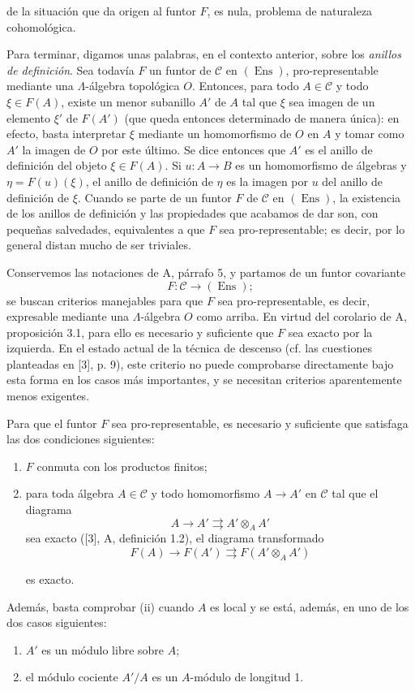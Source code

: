 de la situación que da origen al funtor $F$, es nula, problema de naturaleza
cohomológica.

Para terminar, digamos unas palabras, en el contexto anterior, sobre los
\emph{anillos de definición}. Sea todavía $F$ un funtor de $\mathcal C$ en
$(\operatorname{Ens})$, pro-representable mediante una $\Lambda$-álgebra
topológica $O$. Entonces, para todo $A\in\mathcal C$ y todo $\xi\in F(A)$,
existe un menor subanillo $A'$ de $A$ tal que $\xi$ sea imagen de un elemento
$\xi'$ de $F(A')$ (que queda entonces determinado de manera única): en efecto,
basta interpretar $\xi$ mediante un homomorfismo de $O$ en $A$ y tomar como
$A'$ la imagen de $O$ por este último. Se dice entonces que $A'$ es el anillo
de definición del objeto $\xi\in F(A)$. Si $u:A\longrightarrow B$ es un
homomorfismo de álgebras y $\eta=F(u)(\xi)$, el anillo de definición de $\eta$
es la imagen por $u$ del anillo de definición de $\xi$. Cuando se parte de un
funtor $F$ de $\mathcal C$ en $(\operatorname{Ens})$, la existencia de los
anillos de definición y las propiedades que acabamos de dar son, con pequeñas
salvedades, equivalentes a que $F$ sea pro-representable; es decir, por lo
general distan mucho de ser triviales.


Conservemos las notaciones de A, párrafo 5, y partamos de un funtor covariante
\[
  F:\mathcal C\longrightarrow(\operatorname{Ens});
\]
se buscan criterios manejables para que $F$ sea pro-representable, es decir,
expresable mediante una $\Lambda$-álgebra $O$ como arriba. En virtud del
corolario de A, proposición 3.1, para ello es necesario y suficiente que $F$ sea
exacto por la izquierda. En el estado actual de la técnica de descenso (cf. las
cuestiones planteadas en [3], p. 9), este criterio no puede comprobarse
directamente bajo esta forma en los casos más importantes, y se necesitan
criterios aparentemente menos exigentes.

 Para que el funtor $F$ sea pro-representable, es necesario
y suficiente que satisfaga las dos condiciones siguientes:
\begin{enumerate}
\item[(i)] $F$ conmuta con los productos finitos;
\item[(ii)] para toda álgebra $A\in\mathcal C$ y todo homomorfismo
$A\longrightarrow A'$ en $\mathcal C$ tal que el diagrama
\[
  A\longrightarrow A'\rightrightarrows A'\otimes_A A'
\]
sea exacto ([3], A, definición 1.2), el diagrama transformado
\[
  F(A)\longrightarrow F(A')\rightrightarrows F(A'\otimes_A A')
\]

es exacto.
\end{enumerate}
Además, basta comprobar (ii) cuando $A$ es local y se está, además, en uno de
los dos casos siguientes:
\begin{enumerate}
\item[(a)] $A'$ es un módulo libre sobre $A$;
\item[(b)] el módulo cociente $A'/A$ es un $A$-módulo de longitud 1.
\end{enumerate}

